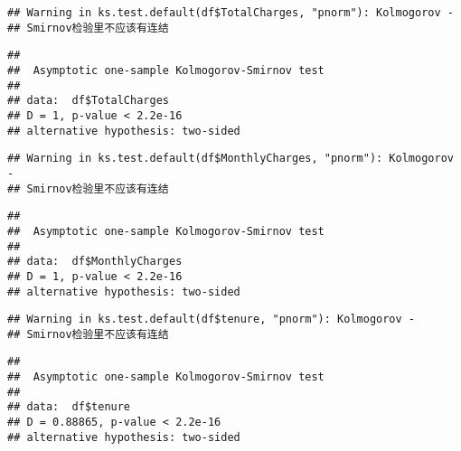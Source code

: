 \documentclass[
]{article}
\newenvironment{Shaded}{\begin{snugshade}}{\end{snugshade}}
\newcommand{\CommentTok}[1]{\textcolor[rgb]{0.56,0.35,0.01}{\textit{#1}}}
\newcommand{\FunctionTok}[1]{\textcolor[rgb]{0.13,0.29,0.53}{\textbf{#1}}}
\newcommand{\NormalTok}[1]{#1}
\newcommand{\SpecialCharTok}[1]{\textcolor[rgb]{0.81,0.36,0.00}{\textbf{#1}}}
\newcommand{\StringTok}[1]{\textcolor[rgb]{0.31,0.60,0.02}{#1}}
\begin{document}
\begin{Shaded}
\end{Shaded}

\begin{verbatim}
## Warning in ks.test.default(df$TotalCharges, "pnorm"): Kolmogorov -
## Smirnov检验里不应该有连结
\end{verbatim}

\begin{verbatim}
## 
##  Asymptotic one-sample Kolmogorov-Smirnov test
## 
## data:  df$TotalCharges
## D = 1, p-value < 2.2e-16
## alternative hypothesis: two-sided
\end{verbatim}

\begin{Shaded}
\end{Shaded}

\begin{verbatim}
## Warning in ks.test.default(df$MonthlyCharges, "pnorm"): Kolmogorov -
## Smirnov检验里不应该有连结
\end{verbatim}

\begin{verbatim}
## 
##  Asymptotic one-sample Kolmogorov-Smirnov test
## 
## data:  df$MonthlyCharges
## D = 1, p-value < 2.2e-16
## alternative hypothesis: two-sided
\end{verbatim}

\begin{Shaded}
\end{Shaded}

\begin{verbatim}
## Warning in ks.test.default(df$tenure, "pnorm"): Kolmogorov -
## Smirnov检验里不应该有连结
\end{verbatim}

\begin{verbatim}
## 
##  Asymptotic one-sample Kolmogorov-Smirnov test
## 
## data:  df$tenure
## D = 0.88865, p-value < 2.2e-16
## alternative hypothesis: two-sided
\end{verbatim}
\end{document}
